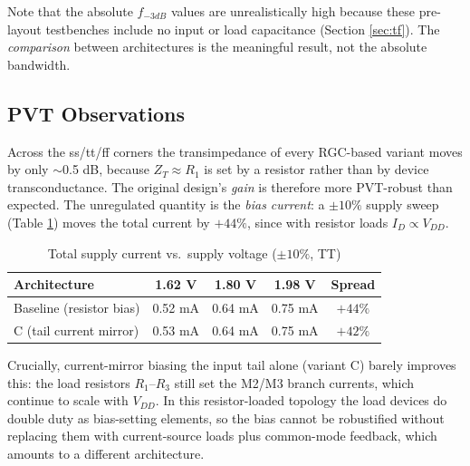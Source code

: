 \documentclass{article}
\begin{document}
Note that the absolute $f_{-3dB}$ values are unrealistically high because these
pre-layout testbenches include no input or load capacitance (Section
\ref{sec:tf}). The \emph{comparison} between architectures is the
meaningful result, not the absolute bandwidth.

\subsection{PVT Observations}
\label{app:pvt}
Across the ss/tt/ff corners the transimpedance of every RGC-based variant moves by
only $\sim$0.5 dB, because $Z_T\approx R_1$ is set by a resistor rather than by
device transconductance. The original design's \emph{gain} is therefore more
PVT-robust than expected. The unregulated quantity is the \emph{bias current}: a
$\pm10\%$ supply sweep (Table \ref{tab:vdd}) moves the total current by $+44\%$,
since with resistor loads $I_D\propto V_{DD}$.

\begin{table}[H]
    \centering
    \caption{Total supply current vs.\ supply voltage ($\pm10\%$, TT)}
    \label{tab:vdd}
    \begin{tabular}{l|c|c|c|c} \hline
        \textbf{Architecture} & \textbf{1.62 V} & \textbf{1.80 V} & \textbf{1.98 V} & \textbf{Spread} \\ \hline
        Baseline (resistor bias)   & 0.52 mA & 0.64 mA & 0.75 mA & $+44\%$ \\ \hline
        C (tail current mirror)    & 0.53 mA & 0.64 mA & 0.75 mA & $+42\%$ \\ \hline
    \end{tabular}
\end{table}

Crucially, current-mirror biasing the input tail alone (variant C) barely improves
this: the load resistors $R_1$--$R_3$ still set the M2/M3 branch currents, which
continue to scale with $V_{DD}$. In this resistor-loaded topology the load devices
do double duty as bias-setting elements, so the bias cannot be robustified without
replacing them with current-source loads plus common-mode feedback, which
amounts to a different architecture.
\end{document}
